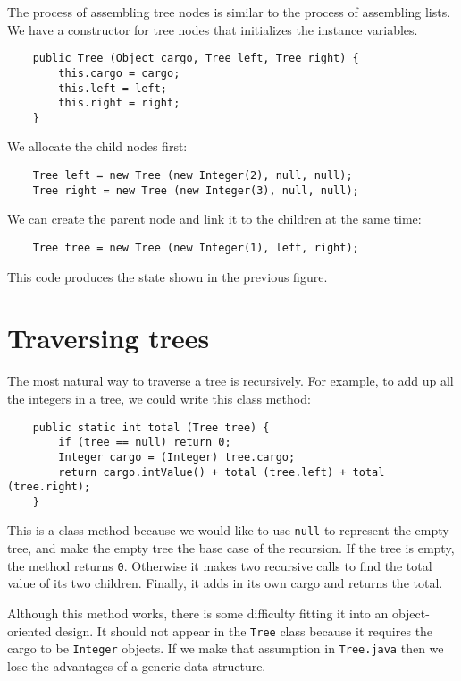 The process of assembling tree nodes is similar
to the process of assembling lists.
We have a constructor for tree nodes that initializes the instance
variables.

\begin{verbatim}
    public Tree (Object cargo, Tree left, Tree right) {
        this.cargo = cargo;
        this.left = left;
        this.right = right;
    }
\end{verbatim}
%
We allocate the child nodes first:

\begin{verbatim}
    Tree left = new Tree (new Integer(2), null, null);
    Tree right = new Tree (new Integer(3), null, null);
\end{verbatim}
%
We can create the parent node and link it to the children
at the same time:

\begin{verbatim}
    Tree tree = new Tree (new Integer(1), left, right);
\end{verbatim}
%
This code produces the state shown in the previous figure.


\section {Traversing trees}

The most natural
way to traverse a tree is recursively.  For example, to
add up all the integers in a tree, we could write this class
method:

\begin{verbatim}
    public static int total (Tree tree) {
        if (tree == null) return 0;
        Integer cargo = (Integer) tree.cargo;
        return cargo.intValue() + total (tree.left) + total (tree.right);
    }
\end{verbatim}
%
This is a class method because we would like to use {\tt null} to
represent the empty tree, and make the empty tree the base case of the
recursion.  If the tree is empty, the method returns {\tt 0}.
Otherwise it makes two recursive calls to find the total value of its
two children.  Finally, it adds in its own cargo and returns the
total.


Although this method works, there is some difficulty fitting it into
an object-oriented design.
It should not appear in the {\tt Tree} class because it
requires the cargo to be {\tt Integer} objects.  If we make that
assumption in {\tt Tree.java} then we lose the advantages of a generic
data structure.

